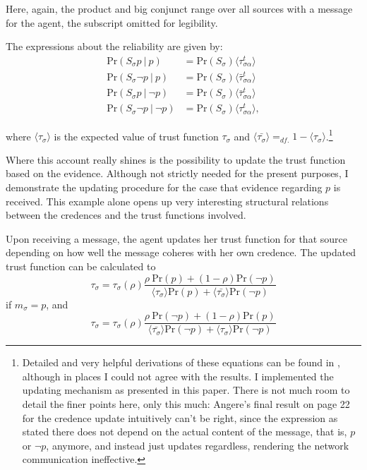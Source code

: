 \documentclass[11pt, a4paper]{scrartcl}
\newcommand{\Ss}{S_{\sigma}}
\newcommand{\sa}{{\sigma\alpha}}
\newcommand{\given}[1][]{\:#1\vert\:}
\renewcommand{\Pr}{\text{Pr}}
\begin{document}
Here, again, the product and big conjunct range over all sources with a message for the agent, the subscript omitted for legibility.   

The expressions about the reliability are given by:
\begin{align*}
    \Pr (\Ss p \given p)            &= \Pr (\Ss) \langle \tau^t_{\sa} \rangle \\
    \Pr (\Ss \neg p \given p)       &= \Pr (\Ss) \langle \bar{\tau}^t_{\sa} \rangle \\
    \Pr (\Ss p \given \neg p)       &= \Pr (\Ss) \langle \bar{\tau}^t_{\sa} \rangle \\
    \Pr (\Ss \neg p \given \neg p)  &= \Pr (\Ss) \langle \tau^t_{\sa} \rangle,
\end{align*}

where $\langle \tau_\sigma \rangle $ is the expected value of trust function $ \tau_\sigma $ and ${\langle \bar{\tau_\sigma} \rangle =_{df.} 1 - \langle \tau_\sigma \rangle}$.\footnote{Detailed and very helpful derivations of these equations can be found in \textcite{Angere2010}, although in places I could not agree with the results. I implemented the updating mechanism as presented in this paper. There is not much room to detail the finer points here, only this much: Angere's final result on page 22 for the credence update intuitively can't be right, since the expression as stated there does not depend on the actual content of the message, that is, $p$ or $\neg p$, anymore, and instead just updates regardless, rendering the network communication ineffective.} 

Where this account really shines is the possibility to update the trust function based on the evidence. Although not strictly needed for the present purposes, I demonstrate the updating procedure for the case that evidence regarding $p$ is received. This example alone opens up very interesting structural relations between the credences and the trust functions involved.

Upon receiving a message, the agent updates her trust function for that source depending on how well the message coheres with her own credence. The updated trust function can be calculated to
\[
    \tau_\sigma = \tau_\sigma (\rho) \frac{\rho \: \Pr(p) + (1 - \rho) \Pr(\neg p)}
    {\langle \tau_\sigma \rangle \Pr(p) + \langle \bar{\tau_\sigma} \rangle \Pr(\neg p)}
\]
if $m_\sigma = p$, and 
\[
    \tau_\sigma = \tau_\sigma (\rho) \frac{\rho \: \Pr(\neg p) + (1 - \rho) \Pr(p)}
    {\langle \bar{\tau_\sigma} \rangle \Pr(\neg p) + \langle \tau_\sigma \rangle \Pr(\neg p)}
\]
\end{document}
